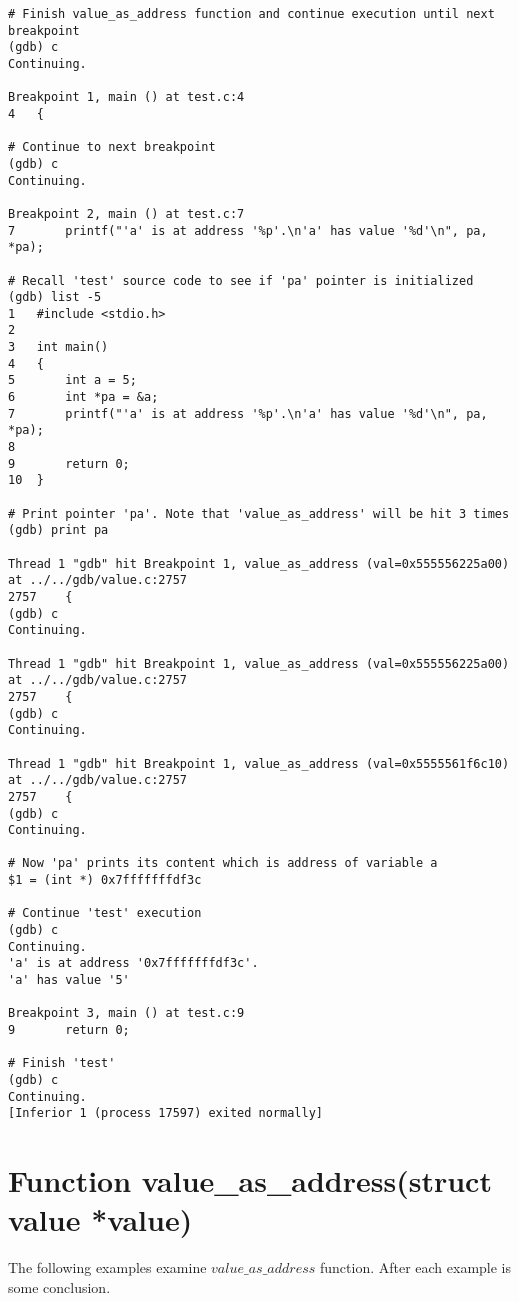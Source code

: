 \documentclass{report}
\begin{document}
\begin{verbatim}
# Finish value_as_address function and continue execution until next breakpoint
(gdb) c 
Continuing.

Breakpoint 1, main () at test.c:4
4	{

# Continue to next breakpoint
(gdb) c 
Continuing.

Breakpoint 2, main () at test.c:7
7		printf("'a' is at address '%p'.\n'a' has value '%d'\n", pa, *pa); 

# Recall 'test' source code to see if 'pa' pointer is initialized
(gdb) list -5  
1	#include <stdio.h>
2	
3	int main()
4	{
5		int a = 5;
6		int *pa = &a;
7		printf("'a' is at address '%p'.\n'a' has value '%d'\n", pa, *pa);
8	
9		return 0;
10	}

# Print pointer 'pa'. Note that 'value_as_address' will be hit 3 times
(gdb) print pa  

Thread 1 "gdb" hit Breakpoint 1, value_as_address (val=0x555556225a00) at ../../gdb/value.c:2757
2757	{
(gdb) c
Continuing.

Thread 1 "gdb" hit Breakpoint 1, value_as_address (val=0x555556225a00) at ../../gdb/value.c:2757
2757	{
(gdb) c
Continuing.

Thread 1 "gdb" hit Breakpoint 1, value_as_address (val=0x5555561f6c10) at ../../gdb/value.c:2757
2757	{
(gdb) c
Continuing.

# Now 'pa' prints its content which is address of variable a
$1 = (int *) 0x7fffffffdf3c   

# Continue 'test' execution
(gdb) c    
Continuing.
'a' is at address '0x7fffffffdf3c'.
'a' has value '5'

Breakpoint 3, main () at test.c:9
9		return 0;

# Finish 'test'
(gdb) c  
Continuing.
[Inferior 1 (process 17597) exited normally]

\end{verbatim}

\section *{Function value\_as\_address(struct value *value)}
The following examples examine $value\_as\_address$ function.
After each example is some conclusion.
\end{document}
